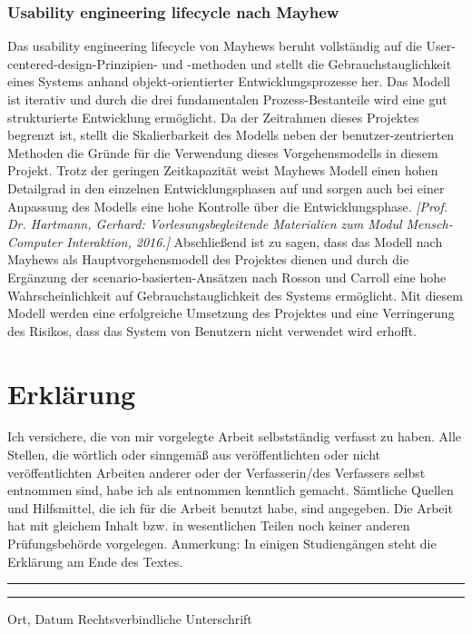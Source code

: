 \documentclass[a4paper,11pt]{article}%
\renewcommand{\\}{\vspace*{0.5\baselineskip} \newline}
\begin{document}
	\subsubsection{Usability engineering lifecycle nach Mayhew}
	Das usability engineering lifecycle von Mayhews beruht vollständig auf die User-centered-design-Prinzipien- und -methoden und stellt die Gebrauchstauglichkeit eines Systems anhand objekt-orientierter Entwicklungsprozesse her. Das Modell ist iterativ und durch die drei fundamentalen Prozess-Bestanteile wird eine gut strukturierte Entwicklung ermöglicht. Da der Zeitrahmen dieses Projektes begrenzt ist, stellt die Skalierbarkeit des Modells neben der benutzer-zentrierten Methoden die Gründe für die Verwendung dieses Vorgehensmodells in diesem Projekt. Trotz der geringen Zeitkapazität weist Mayhews Modell einen hohen Detailgrad in den einzelnen Entwicklungsphasen auf und sorgen auch bei einer Anpassung des Modells eine hohe Kontrolle über die Entwicklungsphase. \emph{[Prof. Dr. Hartmann, Gerhard: Vorlesungsbegleitende Materialien zum Modul Mensch-Computer Interaktion, 2016.]}\\
	Abschließend ist zu sagen, dass das Modell nach Mayhews als Hauptvorgehensmodell des Projektes dienen und durch die Ergänzung der scenario-basierten-Ansätzen nach Rosson und Carroll eine hohe Wahrscheinlichkeit auf Gebrauchstauglichkeit des Systems ermöglicht. Mit diesem Modell werden eine erfolgreiche Umsetzung des Projektes und eine Verringerung des Risikos, dass das System von Benutzern nicht verwendet wird erhofft.
	\newpage
	\appendix
	\section*{Erklärung}\addcontentsline{toc}{section}{Erklärung}
	Ich versichere, die von mir vorgelegte Arbeit selbstständig verfasst zu haben. Alle Stellen, die wörtlich oder sinngemäß aus veröffentlichten oder nicht veröffentlichten Arbeiten anderer oder der Verfasserin/des Verfassers selbst entnommen sind, habe ich als entnommen kenntlich gemacht. Sämtliche Quellen und Hilfsmittel, die ich für die Arbeit benutzt habe, sind angegeben. Die Arbeit hat mit gleichem Inhalt bzw. in wesentlichen Teilen noch keiner anderen Prüfungsbehörde vorgelegen.\\
	Anmerkung: In einigen Studiengängen steht die Erklärung am Ende des Textes.\\
	~\\
	~\\
	\rule{0.35\textwidth}{0.4pt} \hspace*{3cm} \rule{0.45\textwidth}{0.4pt} \newline
	Ort, Datum	\hspace*{6.3cm}	Rechtsverbindliche Unterschrift
	\newpage
\end{document}
